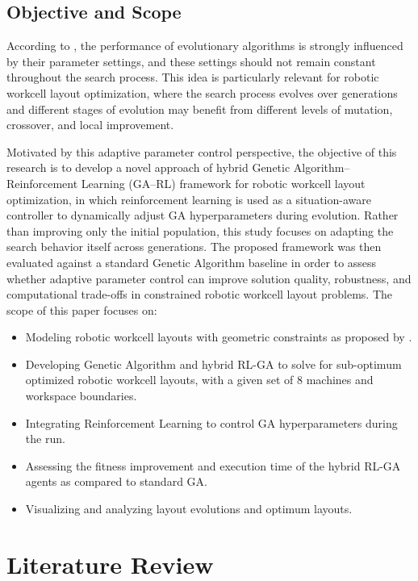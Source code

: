 \documentclass{article}
\begin{document}
\subsection{Objective and Scope}

According to  \textcite{eiben1999parametercontrol}, the performance of evolutionary algorithms is strongly influenced by their parameter settings, and these settings should not remain constant throughout the search process. This idea is particularly relevant for robotic workcell layout optimization, where the search process evolves over generations and different stages of evolution may benefit from different levels of mutation, crossover, and local improvement.

Motivated by this adaptive parameter control perspective, the objective of this research is to develop a novel approach of hybrid Genetic Algorithm--Reinforcement Learning (GA--RL) framework for robotic workcell layout optimization, in which reinforcement learning is used as a situation-aware controller to dynamically adjust GA hyperparameters during evolution. Rather than improving only the initial population, this study focuses on adapting the search behavior itself across generations. The proposed framework was then evaluated against a standard Genetic Algorithm baseline in order to assess whether adaptive parameter control can improve solution quality, robustness, and computational trade-offs in constrained robotic workcell layout problems.
The scope of this paper focuses on:
\begin{itemize}
    \item Modeling robotic workcell layouts with geometric constraints as proposed by \textcite{sim2005rwl}.
    \item Developing Genetic Algorithm and hybrid RL-GA to solve for sub-optimum optimized robotic workcell layouts, with a given set of 8 machines and workspace boundaries.
    \item Integrating Reinforcement Learning to control GA hyperparameters during the run.
    \item Assessing the fitness improvement and execution time of the hybrid RL-GA agents as compared to standard GA.
    \item Visualizing and analyzing layout evolutions and optimum layouts.
\end{itemize}

\newpage
\section{Literature Review}
\end{document}
